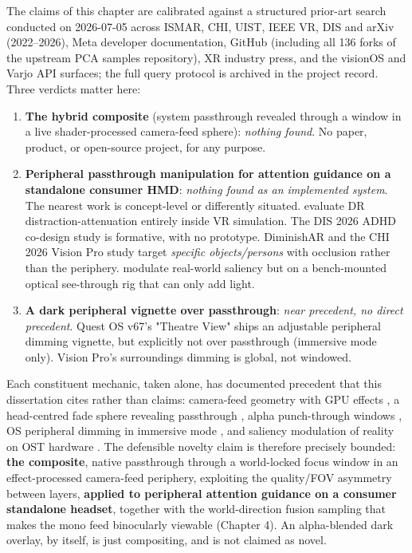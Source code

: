 The claims of this chapter are calibrated against a structured prior-art search conducted on
2026-07-05 across ISMAR, CHI, UIST, IEEE VR, DIS and arXiv (2022–2026), Meta developer documentation,
GitHub (including all 136 forks of the upstream PCA samples repository), XR industry press, and the
visionOS and Varjo API surfaces; the full query protocol is archived in the project record. Three
verdicts matter here:

\begin{enumerate}
\item \textbf{The hybrid composite} (system passthrough revealed through a window in a live shader-processed
camera-feed sphere): \textit{nothing found}. No paper, product, or open-source project, for any purpose.
\item \textbf{Peripheral passthrough manipulation for attention guidance on a standalone consumer HMD}:
\textit{nothing found as an implemented system}. The nearest work is concept-level or differently
situated. \citet{mclaughlin2025} evaluate DR distraction-attenuation entirely inside VR
simulation. The DIS 2026 ADHD co-design study is formative, with no prototype. DiminishAR and the
CHI 2026 Vision Pro study target \textit{specific objects/persons} with occlusion rather than the
periphery. \citet{sutton2022} modulate real-world saliency but on a bench-mounted optical
see-through rig that can only add light.
\item \textbf{A dark peripheral vignette over passthrough}: \textit{near precedent, no direct precedent}. Quest OS
v67's "Theatre View" ships an adjustable peripheral dimming vignette, but explicitly not over
passthrough (immersive mode only). Vision Pro's surroundings dimming is global, not windowed.
\end{enumerate}

Each constituent mechanic, taken alone, has documented precedent that this dissertation cites rather
than claims: camera-feed geometry with GPU effects \citep{coviello2025}, a head-centred
fade sphere revealing passthrough \citep{meta2024c}, alpha
punch-through windows \citep{meta2024b,immersed2022}, OS peripheral dimming in immersive mode \citep{meta2024d}, and saliency modulation of reality on OST hardware \citep{sutton2022}. The defensible
novelty claim is therefore precisely bounded: \textbf{the composite}, native passthrough through a
world-locked focus window in an effect-processed camera-feed periphery, exploiting the quality/FOV
asymmetry between layers, \textbf{applied to peripheral attention guidance on a consumer standalone
headset}, together with the world-direction fusion sampling that makes the mono feed binocularly
viewable (Chapter 4). An alpha-blended dark overlay, by itself, is just compositing, and is not
claimed as novel.


